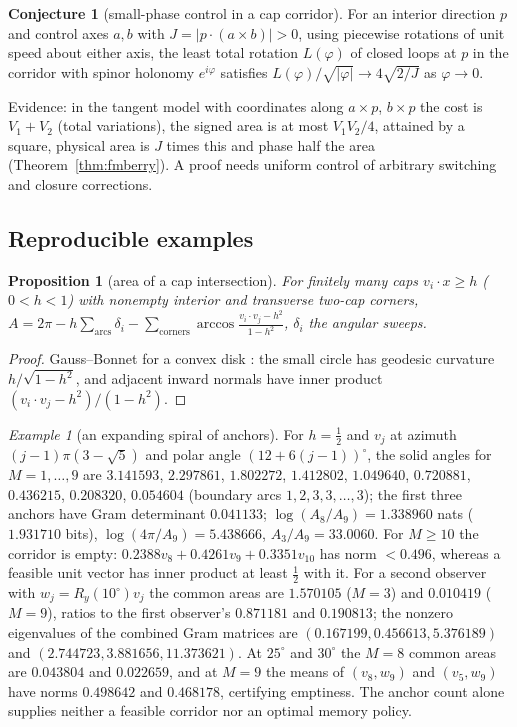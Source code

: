 \documentclass[aps,pra,onecolumn,superscriptaddress,nofootinbib,10pt]{revtex4-2}
\newtheorem{proposition}[theorem]{Proposition}
\theoremstyle{definition}
\newtheorem{conjecture}[theorem]{Conjecture}
\theoremstyle{remark}
\newtheorem{example}[theorem]{Example}
\begin{document}
\begin{conjecture}[small-phase control in a cap corridor]\label{conj:fmcontrol}
For an interior direction $p$ and control axes $a,b$ with $J=\lvert p\cdot(a\times b)\rvert>0$, using piecewise rotations of unit speed
about either axis, the least total rotation $L(\varphi)$ of closed loops at $p$ in the corridor with spinor holonomy
$e^{i\varphi}$ satisfies $L(\varphi)/\sqrt{\lvert\varphi\rvert}\to4\sqrt{2/J}$ as $\varphi\to0$.
\end{conjecture}
\noindent Evidence: in the tangent model with coordinates along $a\times p$, $b\times p$ the cost is $V_1+V_2$ (total variations),
the signed area is at most $V_1V_2/4$, attained by a square, physical area is $J$ times this and phase half the
area (Theorem~\ref{thm:fmberry}).  A proof needs uniform control of arbitrary switching and closure corrections.

\subsection{Reproducible examples}\label{sec:fmexamples}

\begin{proposition}[area of a cap intersection]\label{prop:fmarea}
For finitely many caps $v_i\cdot x\ge h$ ($0<h<1$) with nonempty interior and transverse two-cap corners,
$A=2\pi-h\sum_{\mathrm{arcs}}\delta_i-\sum_{\mathrm{corners}}\arccos\frac{v_i\cdot v_j-h^2}{1-h^2}$, $\delta_i$ the angular sweeps.
\end{proposition}
\begin{proof}
Gauss--Bonnet for a convex disk \cite[Ch.~4, \S5]{n2-docarmo}: the small circle has geodesic curvature $h/\sqrt{1-h^2}$, and adjacent
inward normals have inner product $(v_i\cdot v_j-h^2)/(1-h^2)$.
\end{proof}

\begin{example}[an expanding spiral of anchors]\label{ex:fmspiral}
For $h=\tfrac12$ and $v_j$ at azimuth $(j-1)\pi(3-\sqrt5)$ and polar angle $(12+6(j-1))^\circ$, the solid angles for $M=1,\dots,9$ are
$3.141593$, $2.297861$, $1.802272$, $1.412802$, $1.049640$, $0.720881$, $0.436215$, $0.208320$, $0.054604$ (boundary arcs $1,2,3,3,\dots,3$); the
first three anchors have Gram determinant $0.041133$; $\log(A_8/A_9)=1.338960$ nats ($1.931710$ bits), $\log(4\pi/A_9)=5.438666$, $A_3/A_9=33.0060$.
For $M\ge10$ the corridor is empty: $0.2388v_8+0.4261v_9+0.3351v_{10}$ has norm $<0.496$, whereas a feasible unit vector has inner
product at least $\tfrac12$ with it.  For a second observer with $w_j=R_y(10^\circ)v_j$ the common areas are $1.570105$ ($M=3$) and
$0.010419$ ($M=9$), ratios to the first observer's $0.871181$ and $0.190813$; the nonzero eigenvalues of the combined Gram
matrices are $(0.167199,0.456613,5.376189)$ and $(2.744723,3.881656,11.373621)$.  At $25^\circ$ and $30^\circ$ the $M=8$ common areas are $0.043804$
and $0.022659$, and at $M=9$ the means of $(v_8,w_9)$ and $(v_5,w_9)$ have norms $0.498642$ and $0.468178$, certifying emptiness.  The
anchor count alone supplies neither a feasible corridor nor an optimal memory policy.
\end{example}
\end{document}
